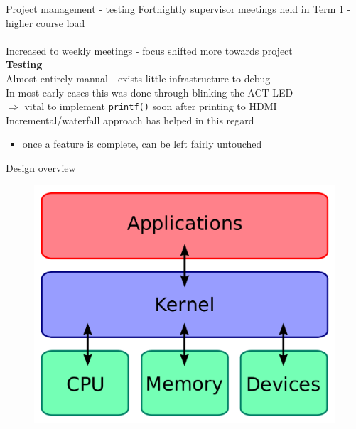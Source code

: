 \documentclass[10pt]{beamer}
\newcommand{\code}[1]{\texttt{#1}}
\begin{document}
\begin{frame}{Project management - testing}
    Fortnightly supervisor meetings held in Term 1 - higher course load \\~\\
    Increased to weekly meetings - focus shifted more towards project \\

    \textbf{Testing} \\
    Almost entirely manual - exists little infrastructure to debug \\
    In most early cases this was done through blinking the ACT LED \\
    $\Rightarrow$ vital to implement \code{printf()} soon after printing to HDMI
    \\

    Incremental/waterfall approach has helped in this regard
    \begin{itemize}
        \item once a feature is complete, can be left fairly untouched
    \end{itemize}
\end{frame}

\begin{frame}{Design overview}
    \begin{figure}
        \centering
        \includegraphics[width=.8\textwidth]{kernel.png}
    \end{figure}
\end{frame}
\end{document}
